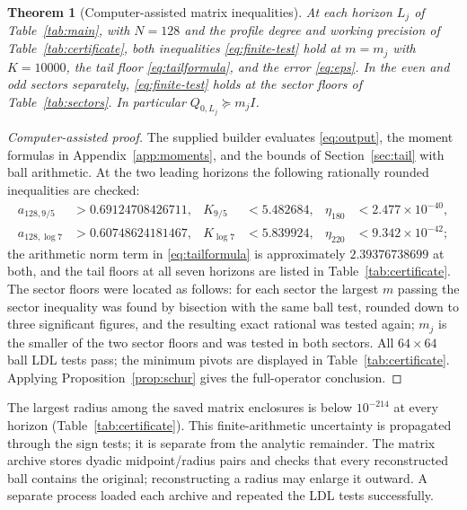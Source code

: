 \documentclass[11pt]{article}
\numberwithin{equation}{section}
\newtheorem{theorem}{Theorem}[section]
\theoremstyle{definition}
\theoremstyle{remark}
\begin{document}
\begin{theorem}[Computer-assisted matrix inequalities]\label{thm:computation}
At each horizon $L_j$ of Table~\ref{tab:main}, with $N=128$ and the profile
degree and working precision of Table~\ref{tab:certificate}, both inequalities
\eqref{eq:finite-test} hold at $m=m_j$ with $K=10000$, the tail floor
\eqref{eq:tailformula}, and the error \eqref{eq:eps}. In the even and odd
sectors separately, \eqref{eq:finite-test} holds at the sector floors of
Table~\ref{tab:sectors}. In particular $Q_{0,L_j}\succeq m_jI$.
\end{theorem}
\begin{proof}[Computer-assisted proof]
The supplied builder evaluates \eqref{eq:output}, the moment formulas in
Appendix~\ref{app:moments}, and the bounds of Section~\ref{sec:tail} with
ball arithmetic. At the two leading horizons the following rationally rounded
inequalities are checked:
\begin{align*}
 a_{128,9/5}&>0.69124708426711,&K_{9/5}&<5.482684,&
 \eta_{180}&<2.477\times10^{-40},\\
 a_{128,\log7}&>0.60748624181467,& K_{\log7}&<5.839924,&
 \eta_{220}&<9.342\times10^{-42};
\end{align*}
the arithmetic norm term in \eqref{eq:tailformula} is approximately
$2.39376738699$ at both, and the tail floors at all seven horizons are listed
in Table~\ref{tab:certificate}. The sector floors were located as follows: for
each sector the largest $m$ passing the sector inequality was found by
bisection with the same ball test, rounded down to three significant figures,
and the resulting exact rational was tested again; $m_j$ is the smaller of the
two sector floors and was tested in both sectors. All $64\times64$ ball LDL
tests pass; the minimum pivots are displayed in Table~\ref{tab:certificate}.
Applying Proposition~\ref{prop:schur} gives the full-operator conclusion.
\end{proof}



The largest radius among the saved matrix enclosures is below
$10^{-214}$ at every horizon (Table~\ref{tab:certificate}). This
finite-arithmetic uncertainty is propagated through the sign tests; it is
separate from the analytic remainder. The matrix archive stores dyadic
midpoint/radius pairs and checks that every reconstructed ball contains the
original; reconstructing a radius may enlarge it outward. A separate process
loaded each archive and repeated the LDL tests successfully.
\end{document}
